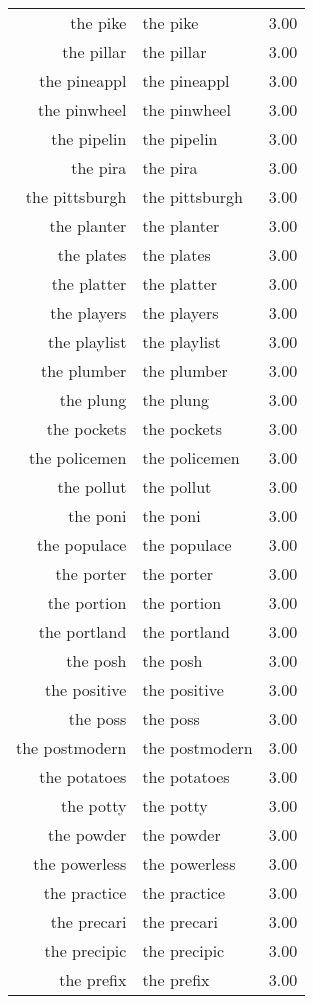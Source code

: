 \begin{table}[ht]
\begin{tabular}{rlr}
  the pike & the pike & 3.00 \\ 
  the pillar & the pillar & 3.00 \\ 
  the pineappl & the pineappl & 3.00 \\ 
  the pinwheel & the pinwheel & 3.00 \\ 
  the pipelin & the pipelin & 3.00 \\ 
  the pira & the pira & 3.00 \\ 
  the pittsburgh & the pittsburgh & 3.00 \\ 
  the planter & the planter & 3.00 \\ 
  the plates & the plates & 3.00 \\ 
  the platter & the platter & 3.00 \\ 
  the players & the players & 3.00 \\ 
  the playlist & the playlist & 3.00 \\ 
  the plumber & the plumber & 3.00 \\ 
  the plung & the plung & 3.00 \\ 
  the pockets & the pockets & 3.00 \\ 
  the policemen & the policemen & 3.00 \\ 
  the pollut & the pollut & 3.00 \\ 
  the poni & the poni & 3.00 \\ 
  the populace & the populace & 3.00 \\ 
  the porter & the porter & 3.00 \\ 
  the portion & the portion & 3.00 \\ 
  the portland & the portland & 3.00 \\ 
  the posh & the posh & 3.00 \\ 
  the positive & the positive & 3.00 \\ 
  the poss & the poss & 3.00 \\ 
  the postmodern & the postmodern & 3.00 \\ 
  the potatoes & the potatoes & 3.00 \\ 
  the potty & the potty & 3.00 \\ 
  the powder & the powder & 3.00 \\ 
  the powerless & the powerless & 3.00 \\ 
  the practice & the practice & 3.00 \\ 
  the precari & the precari & 3.00 \\ 
  the precipic & the precipic & 3.00 \\ 
  the prefix & the prefix & 3.00 \\ 

\end{tabular}
\end{table}
